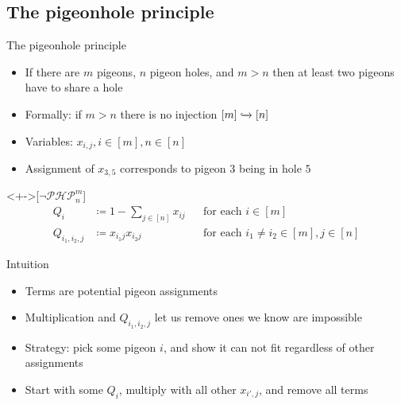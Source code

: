 \documentclass[xcolor={dvipsnames}]{beamer}
\newcommand{\PHP}{\ensuremath{\neg \mathcal{PHP}^m_n}\xspace}
\newcommand{\Qiij}{Q_{i_1, i_2, j}}
\begin{document}
\subsection{The pigeonhole principle}
\begin{frame}{The pigeonhole principle}
    \begin{itemize}[<+->]
        \item If there are $m$ pigeons, $n$ pigeon holes, and $m > n$ then at least two pigeons have to share a hole
        \item Formally: if $m > n$ there is no injection $[m] \tomono [n]$
        \item Variables: $x_{i, j}, i \in [m], n \in [n]$
        \item Assignment of $x_{3, 5}$ corresponds to pigeon $3$ being in hole $5$
    \end{itemize}
    \begin{definition}<+->[\PHP]
        \begin{align*}
            Q_i &\coloneqq 1 - \sum_{j \in [n]} x_{ij} &&\text{for each $i \in [m]$}\\
            \Qiij &\coloneqq x_{i_1j} x_{i_2j} &&\text{for each $i_1 \neq i_2 \in [m], j \in [n]$}
        \end{align*}
    \end{definition}
\end{frame}

\begin{frame}{Intuition}
    \begin{itemize}[<+->]
        \item Terms are potential pigeon assignments
        \item Multiplication and $Q_{i_1, i_2, j}$ let us remove ones we know are impossible\\
        \begin{prooftree}
        \end{prooftree}
        \item Strategy: pick some pigeon $i$, and show it can not fit regardless of other assignments
        \item Start with some $Q_i$, multiply with all other $x_{i', j}$, and remove all terms
    \end{itemize}
\end{frame}
\end{document}
